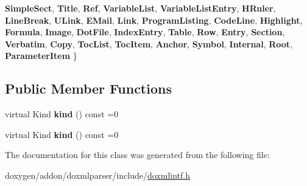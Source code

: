 \begin{DoxyCompactItemize}
\newline
{\bfseries Simple\+Sect}, 
{\bfseries Title}, 
{\bfseries Ref}, 
{\bfseries Variable\+List}, 
\newline
{\bfseries Variable\+List\+Entry}, 
{\bfseries H\+Ruler}, 
{\bfseries Line\+Break}, 
{\bfseries U\+Link}, 
\newline
{\bfseries E\+Mail}, 
{\bfseries Link}, 
{\bfseries Program\+Listing}, 
{\bfseries Code\+Line}, 
\newline
{\bfseries Highlight}, 
{\bfseries Formula}, 
{\bfseries Image}, 
{\bfseries Dot\+File}, 
\newline
{\bfseries Index\+Entry}, 
{\bfseries Table}, 
{\bfseries Row}, 
{\bfseries Entry}, 
\newline
{\bfseries Section}, 
{\bfseries Verbatim}, 
{\bfseries Copy}, 
{\bfseries Toc\+List}, 
\newline
{\bfseries Toc\+Item}, 
{\bfseries Anchor}, 
{\bfseries Symbol}, 
{\bfseries Internal}, 
\newline
{\bfseries Root}, 
{\bfseries Parameter\+Item}
 \}
\end{DoxyCompactItemize}
\subsection*{Public Member Functions}
\begin{DoxyCompactItemize}
\item 
\mbox{\label{class_i_doc_a5a206eaf10cfd437e9f98ee81b972b96}} 
virtual Kind {\bfseries kind} () const =0
\item 
\mbox{\label{class_i_doc_a5a206eaf10cfd437e9f98ee81b972b96}} 
virtual Kind {\bfseries kind} () const =0
\end{DoxyCompactItemize}


The documentation for this class was generated from the following file\+:\begin{DoxyCompactItemize}
\item 
doxygen/addon/doxmlparser/include/\mbox{\hyperlink{include_2doxmlintf_8h}{doxmlintf.\+h}}\end{DoxyCompactItemize}
